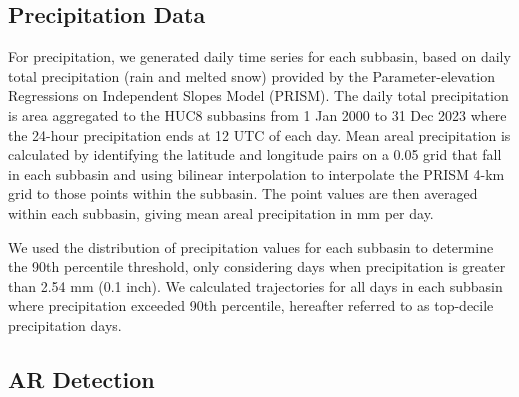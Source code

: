 \documentclass[draft]{agujournal2019}
\begin{document}

\subsection{Precipitation Data}

For precipitation, we generated daily time series for each subbasin, based on daily total precipitation (rain and melted snow) provided by the Parameter-elevation Regressions on Independent Slopes Model (PRISM). The daily total precipitation is area aggregated to the HUC8 subbasins from 1 Jan 2000 to 31 Dec 2023 where the 24-hour precipitation ends at 12 UTC of each day. Mean areal precipitation is calculated by identifying the latitude and longitude pairs on a 0.05\textdegree{} grid that fall in each subbasin and using bilinear interpolation to interpolate the PRISM 4-km grid to those points within the subbasin. The point values are then averaged within each subbasin, giving mean areal precipitation in mm per day. 


We used the distribution of precipitation values for each subbasin to determine the 90th percentile threshold, only considering days when precipitation is greater than 2.54 mm (0.1 inch). We calculated trajectories for all days in each subbasin where precipitation exceeded 90th percentile, hereafter referred to as top-decile precipitation days.


\subsection{AR Detection}
\end{document}
